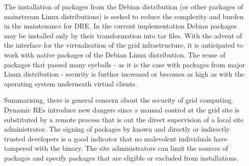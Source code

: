 The installation of packages from the Debian distribution (or other
packages of mainstream Linux distributions) is seeked to reduce the
complexity and burden in the maintenance for DRE. In the
current implementation Debian packages may be installed only by their
transformation into tar files. With the advent of the interface for
the virtualisation of the grid infrastructure, it is anticipated to
work with native packages of the Debian Linux distribution. The reuse
of packages that passed many eyeballs - as it is the case with packages
from major Linux distribution - security is further increased or becomes
as high as with the operating system underneath virtual clients.

Summarising, there is general concern about the security of grid
computing.  Dynamic REs introduce new dangers since a
manual control at the grid site is substituted by a remote process that
is out the direct supervision of a local site administrator. The signing
of packages by known and directly or indirectly trusted developers is
a good indicator that no malevolent individuals have tampered with the
binary. The site administrators can limit the sources of packages and
specify packages that are eligible or excluded from installations.



% 
